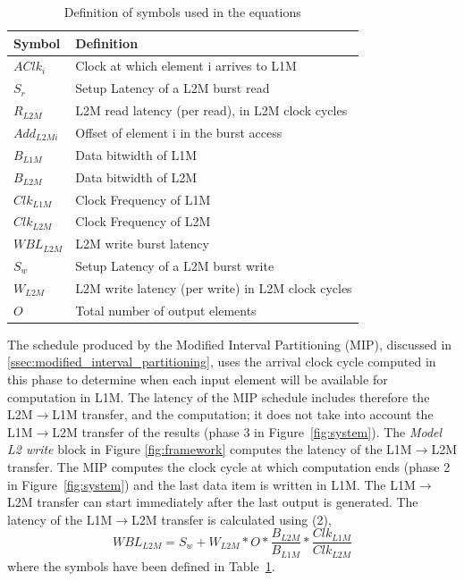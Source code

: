 \begin{table}[]
\centering
\footnotesize
\begin{tabular}{|l|l|}
\hline
\textbf{Symbol} & \textbf{Definition}                                           \\ \hline
$AClk_i$           & Clock at which element i arrives to L1M                \\
$S_r$             & Setup Latency of a L2M burst read                          \\
$R_{L2M}$       & L2M read latency (per read), in L2M clock cycles   \\
$Add_{L2Mi}$     & Offset of element i in the burst access \\
$B_{L1M}$        & Data bitwidth of L1M                                       \\
$B_{L2M}$        & Data bitwidth of L2M                                       \\
$Clk_{L1M}$      & Clock Frequency of L1M                                     \\
$Clk_{L2M}$      & Clock Frequency of L2M                                     \\
$WBL_{L2M}$      & L2M write burst latency                                    \\
$S_w$             & Setup Latency of a L2M burst write                         \\
$W_{L2M}$       & L2M write latency (per write) in L2M clock cycles  \\
$O$                 & Total number of output elements                            \\ \hline
\end{tabular}
\caption{\small Definition of symbols used in the equations}
\label{table:equation}
\end{table}
The schedule produced by the Modified Interval Partitioning (MIP), discussed in \ref{ssec:modified_interval_partitioning}, uses the arrival clock cycle computed in this phase to determine when each input element will be available for computation in L1M. The latency of the MIP schedule includes therefore the L2M$\rightarrow$L1M transfer, and the computation; it does not take into account the L1M$\rightarrow$L2M transfer of the results (phase 3 in Figure~\ref{fig:system}).
The \textit{Model L2 write} block in Figure \ref{fig:framework} computes the latency of the L1M$\rightarrow$L2M transfer. The MIP computes the clock cycle at which computation ends (phase 2 in Figure~\ref{fig:system}) and the last data item is written in L1M. The L1M$\rightarrow$L2M transfer can start immediately after the last output is generated.
The latency of the L1M$\rightarrow$L2M transfer is calculated using (2),
\begin{equation}
    WBL_{L2M} = S_w + W_{L2M} * O * \frac{B_{L2M}}{B_{L1M}} * \frac{Clk_{L1M}}{Clk_{L2M}}
\end{equation}
where the symbols have been defined in Table~\ref{table:equation}.


